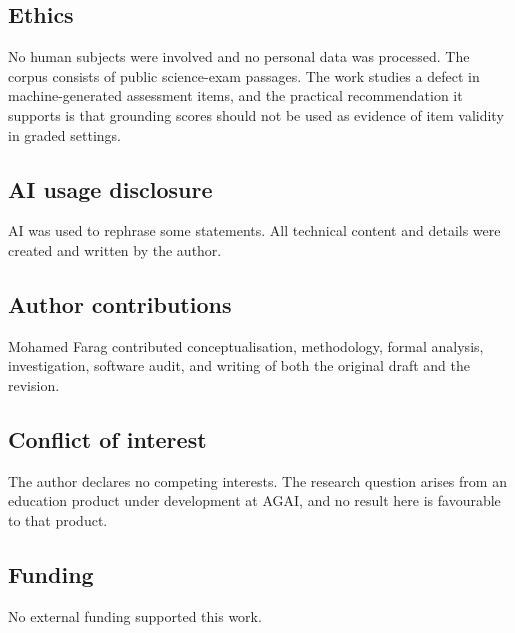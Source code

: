 \documentclass[11pt]{article}
\begin{document}
\subsection{Ethics}

No human subjects were involved and no personal data was processed. The corpus consists of public science-exam passages. The work studies a defect in machine-generated assessment items, and the practical recommendation it supports is that grounding scores should not be used as evidence of item validity in graded settings.

\subsection{AI usage disclosure}

AI was used to rephrase some statements. All technical content and details were created and written by the author.

\subsection{Author contributions}

Mohamed Farag contributed conceptualisation, methodology, formal analysis, investigation, software audit, and writing of both the original draft and the revision.

\subsection{Conflict of interest}

The author declares no competing interests. The research question arises from an education product under development at AGAI, and no result here is favourable to that product.

\subsection{Funding}

No external funding supported this work.

\end{document}
